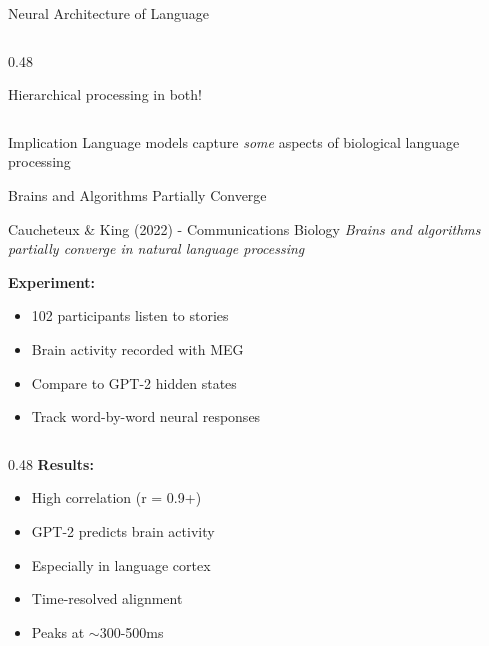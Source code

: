 \documentclass[aspectratio=169]{beamer}
\begin{document}
\begin{frame}{Neural Architecture of Language 🔬}
\begin{columns}[T]
\begin{column}{0.48\textwidth}
\vspace{0.3em}

Hierarchical processing in both!
\end{column}
\end{columns}

\vspace{0.5em}

\begin{alertblock}{Implication}
Language models capture \textit{some} aspects of biological language processing
\end{alertblock}
\end{frame}

\begin{frame}{Brains and Algorithms Partially Converge 🤝}
\begin{block}{Caucheteux \& King (2022) - Communications Biology}
\textit{Brains and algorithms partially converge in natural language processing}
\end{block}

\vspace{0.5em}

\textbf{Experiment:}
\begin{itemize}
    \item 102 participants listen to stories
    \item Brain activity recorded with MEG
    \item Compare to GPT-2 hidden states
    \item Track word-by-word neural responses
\end{itemize}

\vspace{0.5em}

\begin{columns}[T]
\begin{column}{0.48\textwidth}
\textbf{Results:}
\begin{itemize}
    \item \alert{High correlation} (r = 0.9+)
    \item GPT-2 predicts brain activity
    \item Especially in language cortex
    \item Time-resolved alignment
    \item Peaks at $\sim$300-500ms
\end{itemize}

\vspace{0.3em}


\end{column}
\end{columns}
\end{frame}
\end{document}
